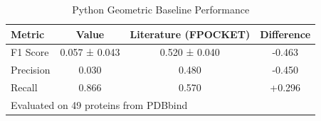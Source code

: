 \begin{table}[h]
\centering
\caption{Python Geometric Baseline Performance}
\label{tab:python_baseline}
\begin{tabular}{lccc}
\toprule
\textbf{Metric} & \textbf{Value} & \textbf{Literature (FPOCKET)} & \textbf{Difference} \\
\midrule
F1 Score & 0.057 ± 0.043 & 0.520 ± 0.040 & -0.463 \\
Precision & 0.030 & 0.480 & -0.450 \\
Recall & 0.866 & 0.570 & +0.296 \\
\midrule
\multicolumn{4}{l}{\small Evaluated on 49 proteins from PDBbind} \\
\bottomrule
\end{tabular}
\end{table}